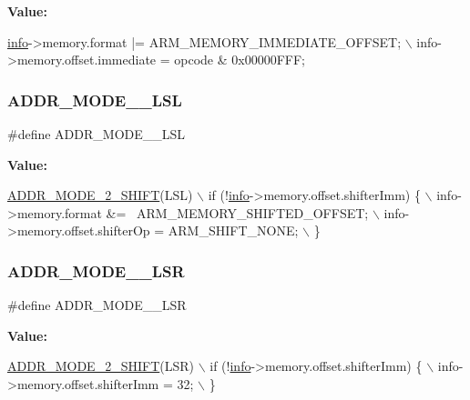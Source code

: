 {\bfseries Value\+:}
\begin{DoxyCode}
\mbox{\hyperlink{libretro_8h_structretro__game__info}{info}}->memory.format |= ARM\_MEMORY\_IMMEDIATE\_OFFSET; \(\backslash\)
    info->memory.offset.immediate = opcode & 0x00000FFF;
\end{DoxyCode}
\mbox{\label{decoder-arm_8c_a3eaad6b803c92180598a98e9d706453a}} 
\subsubsection{\texorpdfstring{A\+D\+D\+R\+\_\+\+M\+O\+D\+E\+\_\+\_\+\+L\+SL}{ADDR\_MODE\_2\_LSL}}
{\footnotesize\ttfamily \#define A\+D\+D\+R\+\_\+\+M\+O\+D\+E\+\_\+\_\+\+L\+SL}

{\bfseries Value\+:}
\begin{DoxyCode}
\mbox{\hyperlink{decoder-arm_8c_a942a66a3ff232d8a62b8f6714fee9858}{ADDR\_MODE\_2\_SHIFT}}(LSL) \(\backslash\)
    if (!\mbox{\hyperlink{libretro_8h_structretro__game__info}{info}}->memory.offset.shifterImm) \{ \(\backslash\)
        info->memory.format &= ~ARM\_MEMORY\_SHIFTED\_OFFSET; \(\backslash\)
        info->memory.offset.shifterOp = ARM\_SHIFT\_NONE; \(\backslash\)
    \}
\end{DoxyCode}
\mbox{\label{decoder-arm_8c_a8d15dc58f1451c9397fe0e2017976826}} 
\subsubsection{\texorpdfstring{A\+D\+D\+R\+\_\+\+M\+O\+D\+E\+\_\+\_\+\+L\+SR}{ADDR\_MODE\_2\_LSR}}
{\footnotesize\ttfamily \#define A\+D\+D\+R\+\_\+\+M\+O\+D\+E\+\_\+\_\+\+L\+SR}

{\bfseries Value\+:}
\begin{DoxyCode}
\mbox{\hyperlink{decoder-arm_8c_a942a66a3ff232d8a62b8f6714fee9858}{ADDR\_MODE\_2\_SHIFT}}(LSR) \(\backslash\)
    if (!\mbox{\hyperlink{libretro_8h_structretro__game__info}{info}}->memory.offset.shifterImm) \{ \(\backslash\)
        info->memory.offset.shifterImm = 32; \(\backslash\)
    \}
\end{DoxyCode}
\mbox{\label{decoder-arm_8c_aaca37bb8bd19deeb47a5427bef082525}} 
